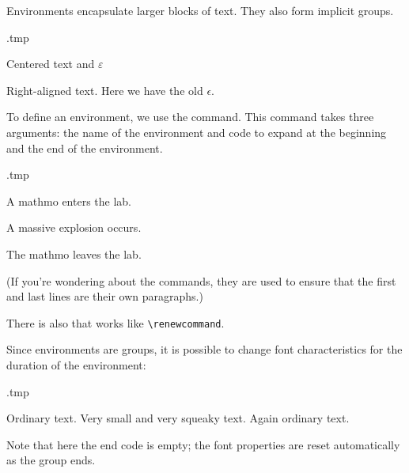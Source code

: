 Environments encapsulate larger blocks of text.
They also form implicit groups.

\begin{VerbatimOut}{\jobname.tmp}
\begin{center}
\renewcommand{\epsilon}{\varepsilon}
Centered text and $\epsilon$
\end{center}

\begin{flushright}
Right-aligned text.
Here we have the old $\epsilon$.
\end{flushright}
\end{VerbatimOut}
\ShowExample

To define an environment, we use the  command.
This command takes three arguments: the name of the environment
and code to expand at the beginning and the end of the environment.

\begin{VerbatimOut}{\jobname.tmp}
\newenvironment{cool}
    {A mathmo enters the lab.\par}
    {\par The mathmo leaves the lab.}

\begin{cool}
A massive explosion occurs.
\end{cool}
\end{VerbatimOut}
\ShowExample
%
(If you're wondering about the  commands,
they are used to ensure that the first and last lines are their own paragraphs.)

There is also  that works like \verb|\renewcommand|.

Since environments are groups,
it is possible to change font characteristics for the duration of the environment:

\begin{VerbatimOut}{\jobname.tmp}
\newenvironment{mouse}{\tiny}{}

Ordinary text.
\begin{mouse}
Very small and very squeaky text.
\end{mouse}
Again ordinary text.
\end{VerbatimOut}
\ShowExample
%
Note that here the end code is empty;
the font properties are reset automatically as the group ends.

